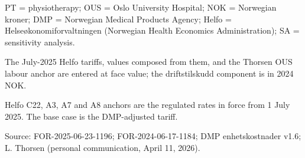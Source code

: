 \begin{table}[H]
{\begin{threeparttable}
\begin{tabular}[t]{>{\raggedright\arraybackslash}p{4.2cm}>{\raggedleft\arraybackslash}p{1.6cm}>{\raggedright\arraybackslash}p{5.4cm}}
\bottomrule
\end{tabular}
\begin{tablenotes}
\item PT = physiotherapy; OUS = Oslo University Hospital; NOK = Norwegian kroner; DMP = Norwegian Medical Products Agency; Helfo = Helseøkonomiforvaltningen (Norwegian Health Economics Administration); SA = sensitivity analysis.
\item The July-2025 Helfo tariffs, values composed from them, and the Thorsen OUS labour anchor are entered at face value; the driftstilskudd component is in 2024 NOK.
\item Helfo C22, A3, A7 and A8 anchors are the regulated rates in force from 1 July 2025. The base case is the DMP-adjusted tariff.
\item Source: FOR-2025-06-23-1196; FOR-2024-06-17-1184; DMP enhetskostnader v1.6; L. Thorsen (personal communication, April 11, 2026).
\end{tablenotes}
\end{threeparttable}
}
\end{table}
